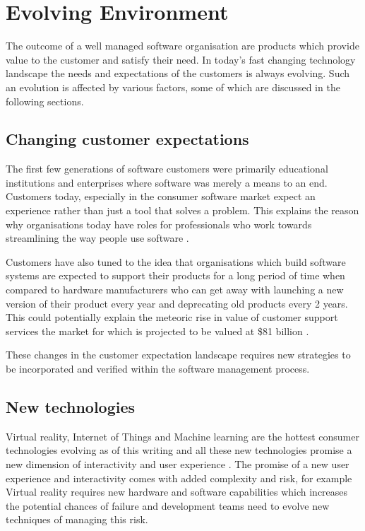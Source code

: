 \documentclass[12pt,conference]{IEEEtran}
\begin{document}
\section*{Evolving Environment}

The outcome of a well managed software organisation are products which provide value to the customer and satisfy their need. In today's fast changing technology landscape the needs and expectations of the customers is always evolving. Such an evolution is affected by various factors, some of which are discussed in the following sections.

\subsection*{Changing customer expectations}

The first few generations of software customers were primarily educational institutions and enterprises where software was merely a means to an end. Customers today, especially in the consumer software market expect an experience rather than just a tool that solves a problem. This explains the reason why organisations today have roles for professionals who work towards streamlining the way people use software \cite{kolko_design_2015} \cite{dixon_stop_2010}.

Customers have also tuned to the idea that organisations which build software systems  are expected to support their products for a long period of time when compared to hardware manufacturers who can get away with launching a new version of their product every year and deprecating old products every 2 years. This could potentially explain the meteoric rise in value of customer support services the market for which is projected to be valued at \$81 billion \cite{wuyts_outsourcing_2015}.

These changes in the customer expectation landscape requires new strategies to be incorporated and verified within the software management process.

\subsection*{New technologies}

Virtual reality, Internet of Things and Machine learning are the hottest consumer technologies evolving as of this writing and all these new technologies promise a new dimension of interactivity and user experience \cite{bachvarov_design-by--customer_2009}. The promise of a new user experience and interactivity comes with added complexity and risk, for example Virtual reality requires new hardware and software capabilities which increases the potential chances of failure and development teams need to evolve new techniques of managing this risk.
\end{document}
